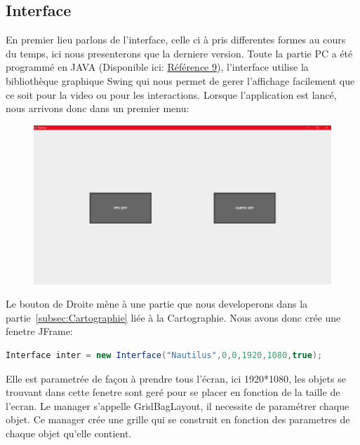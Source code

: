 \documentclass[a4paper,11pt]{report}
\begin{document}
		\subsection{Interface}
			En premier lieu parlons de l'interface, celle ci à pris differentes formes au cours du temps, ici nous presenterons que la derniere version. Toute la partie PC a été programmé en JAVA (Disponible ici: \href{https://github.com/ROV-Nautilus/Nautilus/tree/master/Interface}{Référence 9}), l'interface utilise la bibliothèque graphique Swing qui nous permet de gerer l'affichage facilement que ce soit pour la video ou pour les interactions.
			Lorsque l'application est lancé, nous arrivons donc dans un premier menu:
			\begin{figure}[!h]
					\begin{center}
						\includegraphics[scale=0.35]{Photos/Interface1.png}
					\end{center}
				\end{figure}
				\newline Le bouton de Droite mène à une partie que nous developerons dans la partie~\ref{subsec:Cartographie} liée à la Cartographie.
				\newline \newline Nous avons donc crée une fenetre JFrame:
				\begin{lstlisting}[language=java]
Interface inter = new Interface("Nautilus",0,0,1920,1080,true);
				\end{lstlisting}
				Elle est parametrée de façon à prendre tous l'écran, ici 1920*1080, les objets se trouvant dans cette fenetre sont geré pour se placer en fonction de la taille de l'ecran.
				\newline Le manager s'appelle GridBagLayout, il necessite de paramétrer chaque objet.
				Ce manager crée une grille qui se construit en fonction des parametres de chaque objet qu'elle contient.
\end{document}

